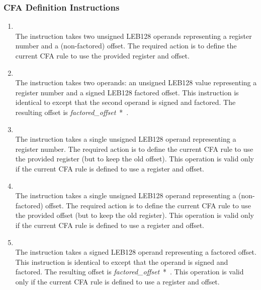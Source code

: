 \subsubsection{CFA Definition Instructions}
\label{chap:cfadefinitioninstructions}
\begin{enumerate}[1. ]

\item \textbf{\DWCFAdefcfaTARG} \\
The \DWCFAdefcfaNAME{}
instruction takes two unsigned LEB128
operands representing a register number and a (non-factored)
offset. The required action is to define the current CFA rule
to use the provided register and offset.

\item \textbf{\DWCFAdefcfasfTARG} \\
The \DWCFAdefcfasfNAME{} instruction takes two operands:
an unsigned LEB128 value
representing a register number and a
signed LEB128 factored offset. This instruction is identical
to \DWCFAdefcfa{} except that the second operand is signed
and factored. The resulting offset is 
\mbox{\textit{factored\_offset} * }.


\item \textbf{\DWCFAdefcfaregisterTARG} \\
The \DWCFAdefcfaregisterNAME{} 
instruction takes a single
unsigned LEB128 operand representing a register number. The
required action is to define the current CFA rule to use
the provided register (but to keep the old offset). This
operation is valid only if the current CFA rule is defined
to use a register and offset.

\item \textbf{\DWCFAdefcfaoffsetTARG} \\
The \DWCFAdefcfaoffsetNAME{} instruction takes a single
unsigned LEB128 operand representing a (non-factored)
offset. The required action is to define the current CFA rule
to use the provided offset (but to keep the old register). This
operation is valid only if the current CFA rule is defined
to use a register and offset.

\item \textbf{\DWCFAdefcfaoffsetsfTARG} \\
The \DWCFAdefcfaoffsetsfNAME{} instruction takes a signed
LEB128 operand representing a 
factored offset. This instruction
is identical to \DWCFAdefcfaoffset{} except that the
operand is signed and factored. The resulting offset is
\mbox{\textit{factored\_offset} * }.
This operation is valid only if the current CFA rule is defined to use a
register and offset.


\end{enumerate}
